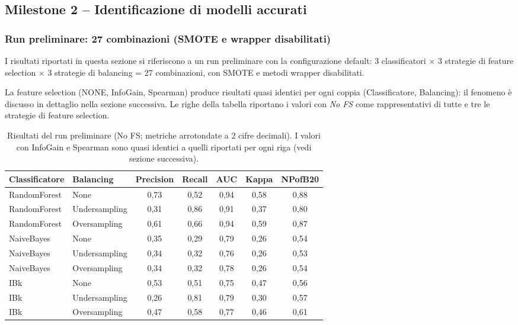 \subsection{Milestone 2 -- Identificazione di modelli accurati}

\subsubsection{Run preliminare: 27 combinazioni (SMOTE e wrapper disabilitati)}

I risultati riportati in questa sezione si riferiscono a un run preliminare con la
configurazione default: 3 classificatori $\times$ 3 strategie di feature selection $\times$
3 strategie di balancing = 27 combinazioni, con SMOTE e metodi wrapper disabilitati.

La feature selection (NONE, InfoGain, Spearman) produce risultati quasi identici per
ogni coppia (Classificatore, Balancing): il fenomeno è discusso in
dettaglio nella sezione successiva. Le righe della tabella riportano i valori con
\textit{No FS} come rappresentativi di tutte e tre le strategie di feature selection.

\begin{table}[h!]
\centering
\small
\begin{tabular}{@{}llccccc@{}}
\toprule
\textbf{Classificatore} & \textbf{Balancing} & \textbf{Precision} & \textbf{Recall} &
\textbf{AUC} & \textbf{Kappa} & \textbf{NPofB20} \\
\midrule
RandomForest  & None          & 0,73 & 0,52 & 0,94 & 0,58 & 0,88 \\
RandomForest  & Undersampling & 0,31 & 0,86 & 0,91 & 0,37 & 0,80 \\
RandomForest  & Oversampling  & 0,61 & 0,66 & 0,94 & 0,59 & 0,87 \\
NaiveBayes    & None          & 0,35 & 0,29 & 0,79 & 0,26 & 0,54 \\
NaiveBayes    & Undersampling & 0,34 & 0,32 & 0,76 & 0,26 & 0,53 \\
NaiveBayes    & Oversampling  & 0,34 & 0,32 & 0,78 & 0,26 & 0,54 \\
IBk           & None          & 0,53 & 0,51 & 0,75 & 0,47 & 0,56 \\
IBk           & Undersampling & 0,26 & 0,81 & 0,79 & 0,30 & 0,57 \\
IBk           & Oversampling  & 0,47 & 0,58 & 0,77 & 0,46 & 0,61 \\
\bottomrule
\end{tabular}
\caption{Risultati del run preliminare (No FS; metriche arrotondate a 2 cifre decimali).
I valori con InfoGain e Spearman sono quasi identici a quelli riportati per ogni riga (vedi sezione successiva).}
\end{table}

